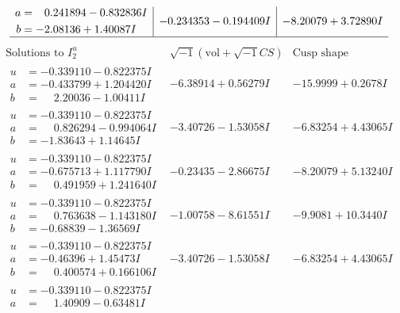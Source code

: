 \documentclass[1p]{elsarticle_modified}
\theoremstyle{definition}
\newcommand{\I}{\sqrt{-1}}
\begin{document}
$$\begin{array}{c|c|c}
\begin{aligned}
a &= \phantom{-}0.241894 - 0.832836 I \\
b &= -2.08136 + 1.40087 I\end{aligned}
 & -0.234353 - 0.194409 I & -8.20079 + 3.72890 I\\
 \hline 
 \end{array}$$\newpage$$\begin{array}{c|c|c}  
\text{Solutions to }I^u_{2}& \I (\text{vol} + \sqrt{-1}CS) & \text{Cusp shape}\\
 \hline 
\begin{aligned}
u &= -0.339110 - 0.822375 I \\
a &= -0.433799 + 1.204420 I \\
b &= \phantom{-}2.20036 - 1.00411 I\end{aligned}
 & -6.38914 + 0.56279 I & -15.9999 + 0.2678 I \\ \hline\begin{aligned}
u &= -0.339110 - 0.822375 I \\
a &= \phantom{-}0.826294 - 0.994064 I \\
b &= -1.83643 + 1.14645 I\end{aligned}
 & -3.40726 - 1.53058 I & -6.83254 + 4.43065 I \\ \hline\begin{aligned}
u &= -0.339110 - 0.822375 I \\
a &= -0.675713 + 1.117790 I \\
b &= \phantom{-}0.491959 + 1.241640 I\end{aligned}
 & -0.23435 - 2.86675 I & -8.20079 + 5.13240 I \\ \hline\begin{aligned}
u &= -0.339110 - 0.822375 I \\
a &= \phantom{-}0.763638 - 1.143180 I \\
b &= -0.68839 - 1.36569 I\end{aligned}
 & -1.00758 - 8.61551 I & -9.9081 + 10.3440 I \\ \hline\begin{aligned}
u &= -0.339110 - 0.822375 I \\
a &= -0.46396 + 1.45473 I \\
b &= \phantom{-}0.400574 + 0.166106 I\end{aligned}
 & -3.40726 - 1.53058 I & -6.83254 + 4.43065 I \\ \hline\begin{aligned}
u &= -0.339110 - 0.822375 I \\
a &= \phantom{-}1.40909 - 0.63481 I \\

\end{aligned}
\end{array}$$
\end{document}
